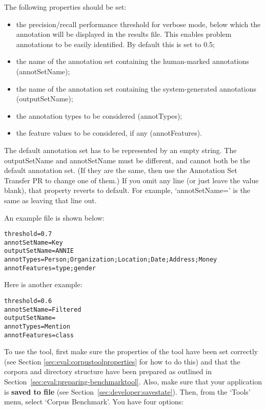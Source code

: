 The following properties should be set:
\begin{itemize}
\item the precision/recall performance threshold for verbose mode, below which
the annotation will be displayed in the results file. This enables problem
annotations to be easily identified. By default this is set to 0.5;
\item the name of the annotation set containing the human-marked
annotations (annotSetName);
\item the name of the annotation set containing the system-generated
annotations (outputSetName);
\item the annotation types to be considered (annotTypes);
\item the feature values to be considered, if any (annotFeatures).
\end{itemize}

The default annotation set has to be represented by an empty string. The
outputSetName and annotSetName must be different, and cannot both be the default
annotation set. (If they are the same, then use the Annotation Set Transfer PR to
change one of them.) If you omit any line (or just leave the value blank), that
property reverts to default. For example, `annotSetName=' is the same as leaving
that line out.

An example file is shown below:
\begin{small}\begin{verbatim}
threshold=0.7
annotSetName=Key
outputSetName=ANNIE
annotTypes=Person;Organization;Location;Date;Address;Money
annotFeatures=type;gender
\end{verbatim}\end{small}

Here is another example:
\begin{small}\begin{verbatim}
threshold=0.6  
annotSetName=Filtered  
outputSetName=  
annotTypes=Mention  
annotFeatures=class  
\end{verbatim}\end{small}


To use the tool, first make sure the properties of the tool have been set
correctly (see Section \ref{sec:eval:corpustoolproperties} for how to do this)
and that the corpora and directory structure have been prepared as outlined in
Section~\ref{sec:eval:preparing-benchmarktool}. Also, make sure that your
application is {\bf saved to file} (see Section~\ref{sec:developer:savestate}).
Then, from the `Tools' menu, select `Corpus Benchmark'. You have four options:

